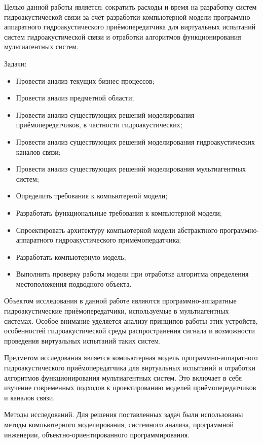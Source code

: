 Целью данной работы является: сократить расходы и время на разработку
систем гидроакустической связи за счёт разработки компьютерной модели
программно-аппаратного гидроакустического приёмопередатчика для
виртуальных испытаний систем гидроакустической связи и отработки
алгоритмов функционирования мультиагентных систем.

Задачи:

\begin{itemize}
\item
  Провести анализ текущих бизнес-процессов;
\item
  Провести анализ предметной области;
\item
  Провести анализ существующих решений моделирования приёмопередатчиков,
  в частности гидроакустических;
\item
  Провести анализ существующих решений моделирования гидроакустических
  каналов связи;
\item
  Провести анализ существующих решений моделирования мультиагентных
  систем;
\item
  Определить требования к компьютерной модели;
\item
  Разработать функциональные требования к компьютерной модели;
\item
  Спроектировать архитектуру компьютерной модели абстрактного
  программно-аппаратного гидроакустического примёмопердатчика;
\item
  Разработать компьютерную модель;
\item
  Выполнить проверку работы модели при отработке алгоритма определения
  местоположения подводного объекта.
\end{itemize}

Объектом исследования в данной работе являются программно-аппаратные
гидроакустические приёмопередатчики, используемые в мультиагентных
системах. Особое внимание уделяется анализу принципов работы этих
устройств, особенностей гидроакустической среды распространения сигнала
и возможности проведения виртуальных испытаний таких систем.

Предметом исследования является компьютерная модель
программно-аппаратного гидроакустического приёмопередатчика для
виртуальных испытаний и отработки алгоритмов функционирования
мультиагентных систем. Это включает в себя изучение современных подходов
к проектированию моделей приёмопередатчиков и каналов связи.

Методы исследований. Для решения поставленных задач были использованы
методы компьютерного моделирования, системного анализа, программной
инженерии, объектно-ориентированного программирования.

